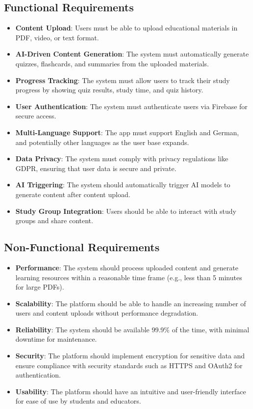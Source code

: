 \documentclass{article}
\begin{document}
\subsection{Functional Requirements}
\begin{itemize}
    \item \textbf{Content Upload}: Users must be able to upload educational materials in PDF, video, or text format.
    \item \textbf{AI-Driven Content Generation}: The system must automatically generate quizzes, flashcards, and summaries from the uploaded materials.
    \item \textbf{Progress Tracking}: The system must allow users to track their study progress by showing quiz results, study time, and quiz history.
    \item \textbf{User Authentication}: The system must authenticate users via Firebase for secure access.
    \item \textbf{Multi-Language Support}: The app must support English and German, and potentially other languages as the user base expands.
    \item \textbf{Data Privacy}: The system must comply with privacy regulations like GDPR, ensuring that user data is secure and private.
    \item \textbf{AI Triggering}: The system should automatically trigger AI models to generate content after content upload.
    \item \textbf{Study Group Integration}: Users should be able to interact with study groups and share content.
\end{itemize}

\subsection{Non-Functional Requirements}
\begin{itemize}
    \item \textbf{Performance}: The system should process uploaded content and generate learning resources within a reasonable time frame (e.g., less than 5 minutes for large PDFs).
    \item \textbf{Scalability}: The platform should be able to handle an increasing number of users and content uploads without performance degradation.
    \item \textbf{Reliability}: The system should be available 99.9\% of the time, with minimal downtime for maintenance.
    \item \textbf{Security}: The platform should implement encryption for sensitive data and ensure compliance with security standards such as HTTPS and OAuth2 for authentication.
    \item \textbf{Usability}: The platform should have an intuitive and user-friendly interface for ease of use by students and educators.
\end{itemize}
\end{document}
